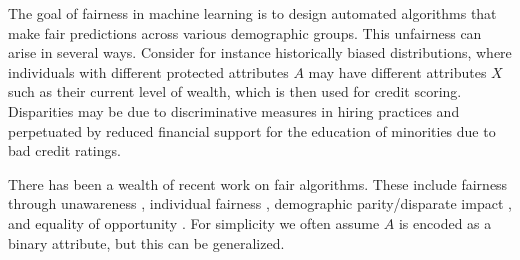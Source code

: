 The goal of fairness in machine learning is to design automated
algorithms that make fair predictions across various demographic
groups. This unfairness can arise in several ways. Consider for
instance historically biased distributions, where individuals with
different protected attributes $A$ may have different attributes
$X$ such as their current level of wealth, which is then used for
credit scoring. Disparities may be due to discriminative measures in
hiring practices and perpetuated by reduced financial support
for the education of minorities due to bad credit ratings.

There has been a wealth of recent work on fair
algorithms. %
These include fairness through unawareness \cite{grgiccase},
individual fairness \cite{dwork2012fairness,zemel2013learning,louizos2015variational,joseph2016rawlsian},
demographic parity/disparate impact \cite{zafar2015learning}, and
equality of opportunity \cite{hardt2016equality,zafar2016fairness}.
For simplicity we often assume $A$ is encoded as a binary attribute,
but this can be generalized.

